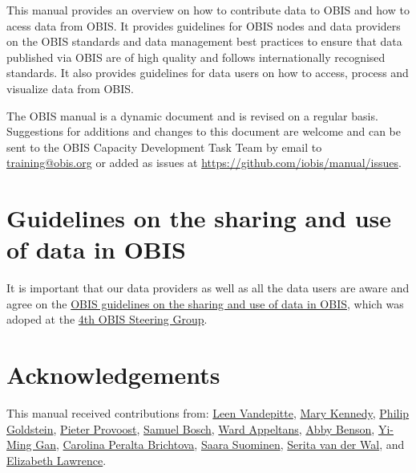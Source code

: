 \documentclass[
  letterpaper,
  DIV=11,
  numbers=noendperiod,
  oneside]{scrreprt}
\begin{document}
This manual provides an overview on how to contribute data to OBIS and
how to acess data from OBIS. It provides guidelines for OBIS nodes and
data providers on the OBIS standards and data management best practices
to ensure that data published via OBIS are of high quality and follows
internationally recognised standards. It also provides guidelines for
data users on how to access, process and visualize data from OBIS.

The OBIS manual is a dynamic document and is revised on a regular basis.
Suggestions for additions and changes to this document are welcome and
can be sent to the OBIS Capacity Development Task Team by email to
\href{mailto:training@iobis.org}{training@obis.org} or added as issues
at \url{https://github.com/iobis/manual/issues}.

\hypertarget{guidelines-on-the-sharing-and-use-of-data-in-obis}{%
\section{Guidelines on the sharing and use of data in
OBIS}\label{guidelines-on-the-sharing-and-use-of-data-in-obis}}

It is important that our data providers as well as all the data users
are aware and agree on the \href{policy.html}{OBIS guidelines on the
sharing and use of data in OBIS}, which was adoped at the
\href{https://obis.org/about/sg-obis-4}{4th OBIS Steering Group}.

\hypertarget{acknowledgements}{%
\section{Acknowledgements}\label{acknowledgements}}

This manual received contributions from:
\href{https://www.oceanexpert.net/expert/12313}{Leen Vandepitte},
\href{https://www.oceanexpert.net/expert/13557}{Mary Kennedy},
\href{https://www.oceanexpert.net/expert/18051}{Philip Goldstein},
\href{https://www.oceanexpert.net/expert/26192}{Pieter Provoost},
\href{https://www.oceanexpert.net/expert/26577}{Samuel Bosch},
\href{https://www.oceanexpert.net/expert/11770}{Ward Appeltans},
\href{https://orcid.org/0000-0002-4391-107X}{Abby Benson},
\href{https://orcid.org/0000-0001-7087-2646}{Yi-Ming Gan},
\href{https://oceanexpert.org/expert/26345}{Carolina Peralta Brichtova},
\href{https://oceanexpert.org/expert/43352}{Saara Suominen},
\href{https://oceanexpert.org/expert/49876}{Serita van der Wal}, and
\href{https://oceanexpert.org/expert/50997}{Elizabeth Lawrence}.
\end{document}
